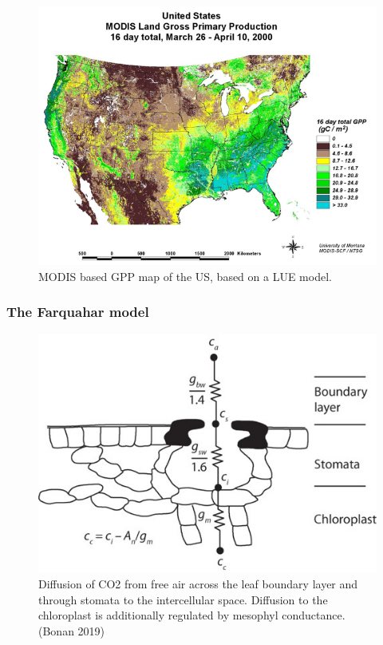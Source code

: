 \documentclass[12pt,oneside]{book}
\begin{document}
\begin{figure}

{\centering \includegraphics[width=0.8\linewidth]{figures/chap2/MODIS_GPP} 

}

\caption{MODIS based GPP map of the US, based on a LUE model.}\label{fig:f26}
\end{figure}

\subsubsection{The Farquahar model}\label{the-farquahar-model}

\begin{figure}

{\centering \includegraphics[width=0.8\linewidth]{figures/chap2/conductance} 

}

\caption{Diffusion of CO2 from free air across the leaf boundary layer and through stomata to the intercellular space. Diffusion to the chloroplast is additionally regulated by mesophyl conductance. (Bonan 2019)}\label{fig:f27}
\end{figure}
\end{document}
